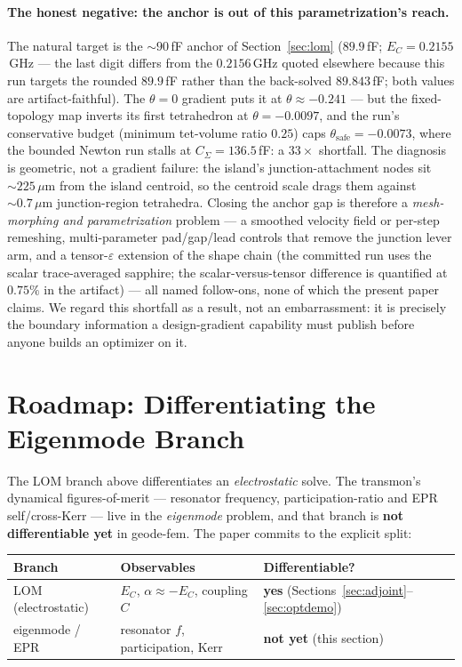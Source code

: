\documentclass{anvil-paper}
\begin{document}
\paragraph{The honest negative: the anchor is out of this
parametrization's reach.} The natural target is the ${\sim}90$\,fF
anchor of Section~\ref{sec:lom} ($89.9$\,fF; $E_C = 0.2155$\,GHz ---
the last digit differs from the $0.2156$\,GHz quoted elsewhere because
this run targets the rounded $89.9$\,fF rather than the back-solved
$89.843$\,fF; both values are artifact-faithful). The
$\theta = 0$ gradient puts it at $\theta \approx -0.241$ --- but the
fixed-topology map inverts its first tetrahedron at $\theta = -0.0097$,
and the run's conservative budget (minimum tet-volume ratio $0.25$) caps
$\theta_{\mathrm{safe}} = -0.0073$, where the bounded Newton run stalls
at $C_\Sigma = 136.5$\,fF: a $33\times$ shortfall. The diagnosis is
geometric, not a gradient failure: the island's junction-attachment
nodes sit ${\sim}225\,\mu$m from the island centroid, so the centroid
scale drags them against ${\sim}0.7\,\mu$m junction-region tetrahedra.
Closing the anchor gap is therefore a \emph{mesh-morphing and
parametrization} problem --- a smoothed velocity field or per-step
remeshing, multi-parameter pad/gap/lead controls that remove the
junction lever arm, and a tensor-$\varepsilon$ extension of the shape
chain (the committed run uses the scalar trace-averaged sapphire; the
scalar-versus-tensor difference is quantified at $0.75\%$ in the
artifact) --- all named follow-ons, none of which the present paper
claims. We regard this shortfall as a result, not an embarrassment: it
is precisely the boundary information a design-gradient capability must
publish before anyone builds an optimizer on it.

\section{Roadmap: Differentiating the Eigenmode Branch}
\label{sec:roadmap}

The LOM branch above differentiates an \emph{electrostatic} solve. The
transmon's dynamical figures-of-merit --- resonator frequency,
participation-ratio and EPR self/cross-Kerr \citep{minev2021,nigg2012}
--- live in the \emph{eigenmode} problem, and that branch is \textbf{not
differentiable yet} in geode-fem. The paper commits to the explicit
split:

\begin{table}[h]
  \centering
  \small
  \begin{tabular}{@{}lll@{}}
    \toprule
    Branch & Observables & Differentiable? \\
    \midrule
    LOM (electrostatic) & $E_C$, $\alpha \approx -E_C$, coupling $C$ &
      \textbf{yes} (Sections~\ref{sec:adjoint}--\ref{sec:optdemo}) \\
    eigenmode / EPR & resonator $f$, participation, Kerr &
      \textbf{not yet} (this section) \\
    \bottomrule
  \end{tabular}
\end{table}
\end{document}
